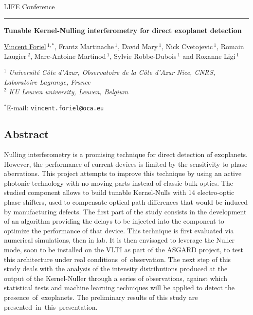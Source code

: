 \documentclass[12pt]{article}
\begin{document}
LIFE Conference

\smallskip
\hrule

\bigskip

\begin{center}
\LARGE \bf Tunable Kernel-Nulling interferometry for direct exoplanet detection\rm

\vspace{0.5cm}

\large  \underline{Vincent Foriel}$\,^{1,*}$, \large Frantz Martinache$\,^1$, \large David Mary$\,^1$, \large Nick Cvetojevic$\,^1$, \large Romain Laugier$\,^2$, Marc-Antoine Martinod$\,^1$, \large Sylvie Robbe-Dubois$\,^1$ and  \large Roxanne Ligi$\,^1$

\vspace{0.5cm}

\normalsize

$^1$ \textit{Université Côte d’Azur, Observatoire de la Côte d’Azur Nice, CNRS, Laboratoire Lagrange, France}\\
$^2$ \textit{KU Leuven university, Leuven, Belgium}

\vspace{0.3cm}
$^*$E-mail: {\tt vincent.foriel@oca.eu}

\end{center}
\vspace{-0.8cm}
\subsection*{\Large Abstract}

Nulling interferometry is a promising technique for direct detection of exoplanets. However, the performance of current devices is limited by the sensitivity to phase aberrations. This project attempts to improve this technique by using an active photonic technology with no moving parts instead of classic bulk optics. The studied component allows to build tunable Kernel-Nulls with 14 electro-optic phase shifters, used to compensate optical path differences that would be induced by manufacturing defects. The first part of the study consists in the development of an algorithm providing the delays to be injected into the component to optimize the performance of that device. This technique is first evaluated via numerical simulations, then in lab. It is then envisaged to leverage the Nuller mode, soon to be installed on the VLTI as part of the ASGARD project, to test this architecture under real conditions of observation. The next step of this study deals with the analysis of the intensity distributions produced at the output of the Kernel-Nuller through a series of observations, against which statistical tests and machine learning techniques will be applied to detect the presence of exoplanets. The preliminary results of this study are presented in this presentation.
\end{document}
